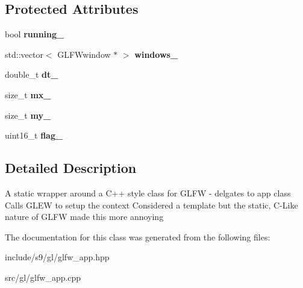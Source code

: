 \subsection*{\-Protected \-Attributes}
\begin{DoxyCompactItemize}
\item 
\hypertarget{classs9_1_1gl_1_1GLFWApp_aed2a0d772c56e7ffdedf8d5eddd157bf}{bool {\bfseries running\-\_\-}}\label{classs9_1_1gl_1_1GLFWApp_aed2a0d772c56e7ffdedf8d5eddd157bf}

\item 
\hypertarget{classs9_1_1gl_1_1GLFWApp_a72ad3e0eb17c0a522c4023934dee81a4}{std\-::vector$<$ \-G\-L\-F\-Wwindow $\ast$ $>$ {\bfseries windows\-\_\-}}\label{classs9_1_1gl_1_1GLFWApp_a72ad3e0eb17c0a522c4023934dee81a4}

\item 
\hypertarget{classs9_1_1gl_1_1GLFWApp_a1c478d7892232e2e3395f925fbc9a842}{double\-\_\-t {\bfseries dt\-\_\-}}\label{classs9_1_1gl_1_1GLFWApp_a1c478d7892232e2e3395f925fbc9a842}

\item 
\hypertarget{classs9_1_1gl_1_1GLFWApp_a162114e838ccfd5b3f5a840992ff32d9}{size\-\_\-t {\bfseries mx\-\_\-}}\label{classs9_1_1gl_1_1GLFWApp_a162114e838ccfd5b3f5a840992ff32d9}

\item 
\hypertarget{classs9_1_1gl_1_1GLFWApp_a23f7e95cfbb96fbc77fa360dde26ca35}{size\-\_\-t {\bfseries my\-\_\-}}\label{classs9_1_1gl_1_1GLFWApp_a23f7e95cfbb96fbc77fa360dde26ca35}

\item 
\hypertarget{classs9_1_1gl_1_1GLFWApp_a5b23726188fde50271b9847fe811399c}{uint16\-\_\-t {\bfseries flag\-\_\-}}\label{classs9_1_1gl_1_1GLFWApp_a5b23726188fde50271b9847fe811399c}

\end{DoxyCompactItemize}


\subsection{\-Detailed \-Description}
\-A static wrapper around a \-C++ style class for \-G\-L\-F\-W -\/ delgates to app class \-Calls \-G\-L\-E\-W to setup the context \-Considered a template but the static, \-C-\/\-Like nature of \-G\-L\-F\-W made this more annoying 

\-The documentation for this class was generated from the following files\-:\begin{DoxyCompactItemize}
\item 
include/s9/gl/glfw\-\_\-app.\-hpp\item 
src/gl/glfw\-\_\-app.\-cpp\end{DoxyCompactItemize}
